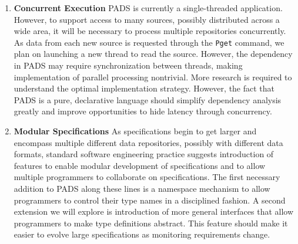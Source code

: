 \begin{enumerate}
\item {\bf Concurrent Execution}  
PADS is currently a single-threaded application.  However,
to support access to many sources, possibly distributed
across a wide area, it will be necessary to process multiple
repositories concurrently.  As data from each new source is requested
through the \texttt{Pget} command, we plan on launching a new thread
to read the source.  However, the dependency in PADS may
require synchronization between threads, making implementation
of parallel processing nontrivial.  More research is required to
understand the optimal implementation strategy.  However, the fact that
PADS is a pure, declarative language should simplify dependency
analysis greatly and improve opportunities to hide latency through
concurrency.



\item {\bf Modular Specifications}
As specifications begin to get larger and encompass multiple different
data repositories, possibly with different data formats, standard
software engineering practice suggests introduction of features to
enable modular development of specifications and to allow multiple
programmers to collaborate on specifications.  The first necessary
addition to PADS along these lines is a namespace mechanism to allow
programmers to control their type names in a disciplined fashion.  A
second extension we will explore is introduction of more general
interfaces that allow programmers to make type definitions abstract.
This feature should make it easier to evolve large specifications as
monitoring requirements change.

\end{enumerate}



